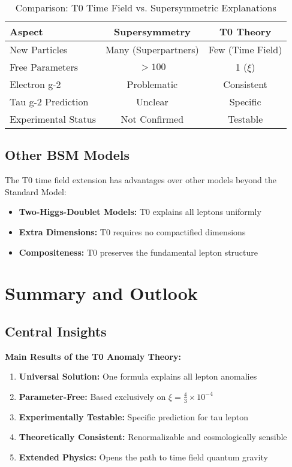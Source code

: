 \documentclass[12pt,a4paper]{article}
\newcommand{\xipar}{\xi}
\begin{document}
	\begin{table}[h]
		\centering
		\begin{tabular}{lcc}
			\toprule
			\textbf{Aspect} & \textbf{Supersymmetry} & \textbf{T0 Theory} \\
			\midrule
			New Particles & Many (Superpartners) & Few (Time Field) \\
			Free Parameters & $>100$ & 1 ($\xipar$) \\
			Electron g-2 & Problematic & Consistent \\
			Tau g-2 Prediction & Unclear & Specific \\
			Experimental Status & Not Confirmed & Testable \\
			\bottomrule
		\end{tabular}
		\caption{Comparison: T0 Time Field vs. Supersymmetric Explanations}
	\end{table}
	
	\subsection{Other BSM Models}
	
	The T0 time field extension has advantages over other models beyond the Standard Model:
	
	\begin{itemize}
		\item \textbf{Two-Higgs-Doublet Models:} T0 explains all leptons uniformly
		\item \textbf{Extra Dimensions:} T0 requires no compactified dimensions
		\item \textbf{Compositeness:} T0 preserves the fundamental lepton structure
	\end{itemize}
	
	\section{Summary and Outlook}
	
	\subsection{Central Insights}
	
	\begin{keyresult}
		\textbf{Main Results of the T0 Anomaly Theory:}
		
		\begin{enumerate}
			\item \textbf{Universal Solution:} One formula explains all lepton anomalies
			\item \textbf{Parameter-Free:} Based exclusively on $\xipar = \frac{4}{3} \times 10^{-4}$
			\item \textbf{Experimentally Testable:} Specific prediction for tau lepton
			\item \textbf{Theoretically Consistent:} Renormalizable and cosmologically sensible
			\item \textbf{Extended Physics:} Opens the path to time field quantum gravity
		\end{enumerate}
	\end{keyresult}
	
\end{document}
